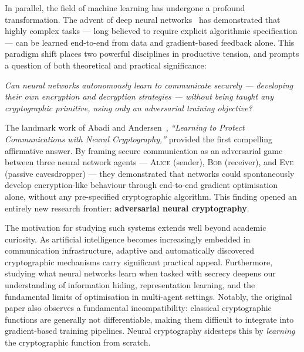 \documentclass[12pt, a4paper]{article}
\newcommand{\alice}{\textsc{Alice}}
\newcommand{\bob}{\textsc{Bob}}
\newcommand{\eve}{\textsc{Eve}}
\begin{document}
In parallel, the field of machine learning has undergone a profound
transformation. The advent of deep neural
networks~\cite{lecun2015deeplearning} has demonstrated that highly
complex tasks — long believed to require explicit algorithmic specification
— can be learned end-to-end from data and gradient-based feedback alone.
This paradigm shift places two powerful disciplines in productive tension,
and prompts a question of both theoretical and practical significance:

\begin{tcolorbox}[researchbox, title={Central Research Question}]
  \centering\itshape
  Can neural networks autonomously learn to communicate securely —
  developing their own encryption and decryption strategies — without
  being taught any cryptographic primitive, using only an adversarial
  training objective?
\end{tcolorbox}

\vspace{0.3cm}

The landmark work of Abadi and Andersen~\cite{abadi2016learning},
\textit{``Learning to Protect Communications with Neural Cryptography,''}
provided the first compelling affirmative answer. By framing secure
communication as an adversarial game between three neural network
agents — \alice{} (sender), \bob{} (receiver), and \eve{} (passive
eavesdropper) — they demonstrated that networks could spontaneously
develop encryption-like behaviour through end-to-end gradient optimisation
alone, without any pre-specified cryptographic algorithm. This finding
opened an entirely new research frontier:
\textbf{adversarial neural cryptography}.

The motivation for studying such systems extends well beyond academic
curiosity. As artificial intelligence becomes increasingly embedded in
communication infrastructure, adaptive and automatically discovered
cryptographic mechanisms carry significant practical appeal. Furthermore,
studying what neural networks learn when tasked with secrecy deepens our
understanding of information hiding, representation learning, and the
fundamental limits of optimisation in multi-agent settings. Notably, the
original paper also observes a fundamental incompatibility: classical
cryptographic functions are generally not differentiable, making them
difficult to integrate into gradient-based training pipelines. Neural
cryptography sidesteps this by \emph{learning} the cryptographic function
from scratch.

\end{document}
